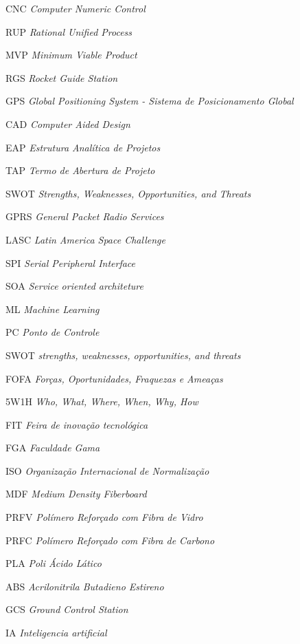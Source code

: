 \begin{siglas}
  \item [CNC] \textit{Computer Numeric Control}
  \item [RUP] \textit{Rational Unified Process}
  \item [MVP] \textit{Minimum Viable Product}
  \item [RGS] \textit{Rocket Guide Station}
  \item [GPS] \textit{Global Positioning System - Sistema de Posicionamento Global}
  \item [CAD] \textit{Computer Aided Design}
  \item [EAP] \textit{ Estrutura Analítica de Projetos}
  \item [TAP] \textit{Termo de Abertura de Projeto}
  \item [SWOT] \textit{Strengths, Weaknesses, Opportunities, and Threats}
  \item [GPRS] \textit{General Packet Radio Services}
  \item [LASC] \textit{Latin America Space Challenge}
  \item [SPI] \textit{Serial Peripheral Interface}
  \item [SOA] \textit{Service oriented architeture}
  \item [ML] \textit{Machine Learning}
  \item [PC] \textit{Ponto de Controle}
  \item [SWOT] \textit{strengths, weaknesses, opportunities, and threats}
  \item [FOFA] \textit{Forças, Oportunidades, Fraquezas e Ameaças}
  \item [5W1H] \textit{Who, What, Where, When, Why, How}
  \item [FIT] \textit{Feira de inovação tecnológica}
  \item [FGA] \textit{Faculdade Gama}
  \item [ISO] \textit{Organização Internacional de Normalização}
  \item [MDF] \textit{Medium Density Fiberboard}
  \item [PRFV] \textit{Polímero Reforçado com Fibra de Vidro}
  \item [PRFC] \textit{Polímero Reforçado com Fibra de Carbono}
  \item [PLA] \textit{Poli Ácido Lático}
  \item [ABS] \textit{Acrilonitrila Butadieno Estireno}
  \item [GCS] \textit{Ground Control Station}
  \item [IA] \textit{Inteligencia artificial}
  
 
  
\end{siglas}
